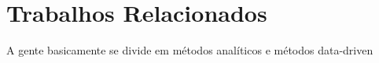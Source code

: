 \chapter{Trabalhos Relacionados}

A gente basicamente se divide em métodos analíticos e métodos data-driven





